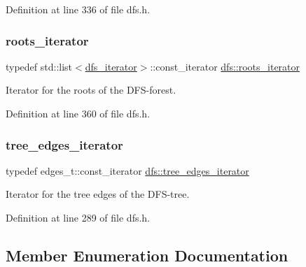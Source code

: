 Definition at line 336 of file dfs.\+h.

\mbox{\label{classdfs_a1ea6e8eb2766ac95ac48a8523359065a}} 
\subsubsection{\texorpdfstring{roots\+\_\+iterator}{roots\_iterator}}
{\footnotesize\ttfamily typedef std\+::list$<$\mbox{\hyperlink{classdfs_a15fe023a5a1f7ddda00f3d87110d9a32}{dfs\+\_\+iterator}}$>$\+::const\+\_\+iterator \mbox{\hyperlink{classdfs_a1ea6e8eb2766ac95ac48a8523359065a}{dfs\+::roots\+\_\+iterator}}\hspace{0.3cm}{\ttfamily [inherited]}}



Iterator for the roots of the D\+F\+S-\/forest. 



Definition at line 360 of file dfs.\+h.

\mbox{\label{classdfs_accde8d5403404f6d22fe4756d4ffedd5}} 
\subsubsection{\texorpdfstring{tree\+\_\+edges\+\_\+iterator}{tree\_edges\_iterator}}
{\footnotesize\ttfamily typedef edges\+\_\+t\+::const\+\_\+iterator \mbox{\hyperlink{classdfs_accde8d5403404f6d22fe4756d4ffedd5}{dfs\+::tree\+\_\+edges\+\_\+iterator}}\hspace{0.3cm}{\ttfamily [inherited]}}



Iterator for the tree edges of the D\+F\+S-\/tree. 



Definition at line 289 of file dfs.\+h.



\subsection{Member Enumeration Documentation}
\mbox{\label{classalgorithm_af1a0078e153aa99c24f9bdf0d97f6710}} 
